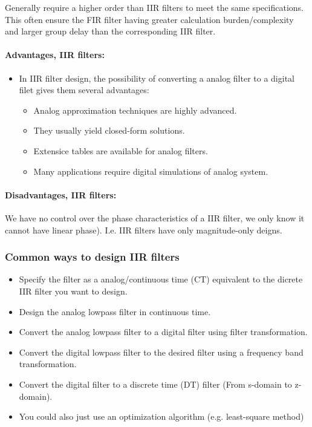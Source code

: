\documentclass{article}
\begin{document}
Generally require a higher order than IIR filters to meet the same specifications. This often ensure the FIR filter having greater calculation burden/complexity and larger group delay than the corresponding IIR filter.

\paragraph{Advantages, IIR filters:}
\begin{itemize}
    \item In IIR filter design, the possibility of converting a analog filter to a digital filet gives them several advantages:
    \begin{itemize}
        \item Analog approximation techniques are highly advanced.
        \item They usually yield closed-form solutions.
        \item Extensice tables are available for analog filters.
        \item Many applications require digital simulations of analog system.
    \end{itemize}
\end{itemize}

\paragraph{Disadvantages, IIR filters:}
We have no control over the phase characteristics of a IIR filter, we only know it cannot have linear phase). I.e. IIR filters have only magnitude-only deigns.

\subsubsection{Common ways to design IIR filters}
\begin{itemize}
    \item Specify the filter as a analog/continuous time (CT) equivalent to the dicrete IIR filter you want to design.
    \item Design the analog lowpass filter in continuous time.
    \item Convert the analog lowpass filter to a digital filter using filter transformation.
    \item Convert the digital lowpass filter to the desired filter using a frequency band transformation.
    \item Convert the digital filter to a discrete time (DT) filter (From s-domain to z-domain).
    \item You could also just use an optimization algorithm (e.g. least-square method)
\end{itemize}
\end{document}
